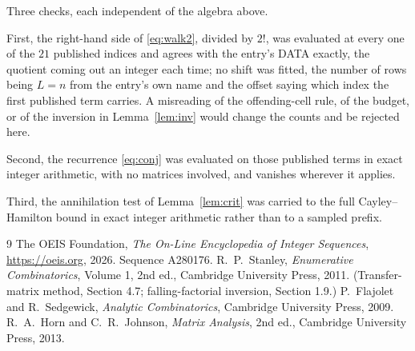 \documentclass[11pt,a4paper]{article}
\theoremstyle{plain}
\theoremstyle{definition}
\begin{document}
Three checks, each independent of the algebra above.

First, the right-hand side of \eqref{eq:walk2}, divided by $2!$, was evaluated at every
one of the $21$ published indices and agrees with the entry's DATA exactly, the quotient
coming out an integer each time; no shift was fitted, the number of rows being
$L=n$ from the entry's own name and the offset saying which index the first published
term carries. A misreading of the offending-cell rule, of the budget, or of the inversion in
Lemma~\ref{lem:inv} would change the counts and be rejected here.

Second, the recurrence \eqref{eq:conj} was evaluated on those published terms in exact
integer arithmetic, with no matrices involved, and vanishes wherever it applies.

Third, the annihilation test of Lemma~\ref{lem:crit} was carried to the full
Cayley--Hamilton bound in exact integer arithmetic rather than to a sampled prefix.

\begin{thebibliography}{9}
 The OEIS Foundation, \emph{The On-Line Encyclopedia of Integer
Sequences}, \url{https://oeis.org}, 2026. Sequence A280176.
 R.~P.~Stanley, \emph{Enumerative Combinatorics}, Volume 1, 2nd ed.,
Cambridge University Press, 2011. (Transfer-matrix method, Section 4.7; falling-factorial
inversion, Section 1.9.)
 P.~Flajolet and R.~Sedgewick, \emph{Analytic Combinatorics}, Cambridge
University Press, 2009.
 R.~A.~Horn and C.~R.~Johnson, \emph{Matrix Analysis}, 2nd ed., Cambridge
University Press, 2013.
\end{thebibliography}
\end{document}
